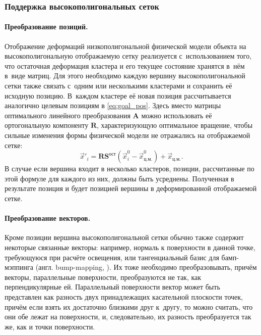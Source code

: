 \documentclass[a4paper, 14pt, titlepage]{extarticle}
\newcommand{\eng}[1]{{\English #1}}
\newcommand{\vect}[1]{\vec{#1}} %
\newcommand{\matx}[1]{\mathbf{#1}} %
\begin{document}
      \subsubsection{Поддержка высокополигональных сеток}\label{sssec:hi-poly}

        \paragraph{Преобразование позиций.}
        Отображение деформаций низкополигональной физической модели объекта на высокополигональную
        отображаемую сетку реализуется с~использованием того, что остаточная деформация кластера и
        его текущее состояние хранятся в~нём в~виде матриц.  Для этого необходимо каждую вершину
        высокополигональной сетки также связать с~одним или несколькими кластерами и сохранить её
        исходную позицию. В~каждом кластере её новая позиция рассчитывается аналогично целевым
        позициям в \eqref{eq:goal_pos}. Здесь вместо матрицы оптимального линейного преобразования
        $\matx A$ можно использовать её ортогональную компоненту $\matx R$, характеризующую
        оптимальное вращение, чтобы сильные изменения формы физической модели не отражались на
        отображаемой сетке:
        \begin{equation}\label{eq:graphical_pos}
          \vect{x}'_i = \matx{R} \matx{S}^{ост} (\vect{x}^0_i - \vect{x}^0_{ц.м.}) + \vect{x}_{ц.м.}.
        \end{equation}
        В случае если вершина входит в несколько кластеров, позиции, рассчитанные по этой формуле
        для каждого из них, должны быть усреднены. Полученная в результате позиция и будет позицией
        вершины в деформированной отображаемой сетке.

        \paragraph{Преобразование векторов.}
        Кроме позиции вершина высокополигональной сетки обычно также содержит некоторые связанные векторы:
        например, нормаль к поверхности в данной точке, требующуюся при расчёте освещения, или
        тангенциальный базис для бамп-мэппинга (англ. \eng{bump-mapping}, \cite{blinn-bump}). Их тоже необходимо
        преобразовывать, причём векторы, параллельные поверхности, преобразуются не так, как
        перпендикулярные ей. Параллельный поверхности вектор может быть представлен как разность двух
        принадлежащих касательной плоскости точек, причём если взять их достаточно близкими друг
        к~другу, то можно считать, что они обе лежат на поверхности, и, следовательно, их разность
        преобразуется так же, как и точки поверхности.
\end{document}
